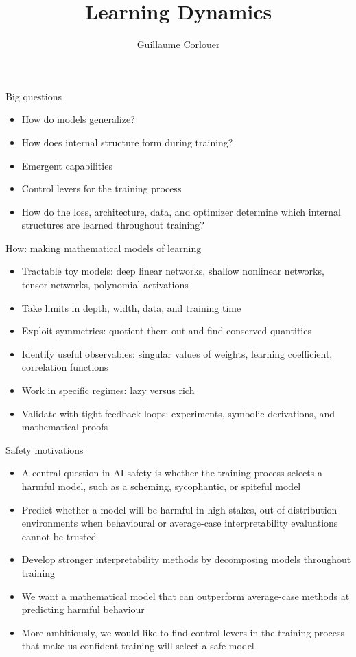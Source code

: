 \documentclass[aspectratio=169,11pt]{beamer}
\title[]{Learning Dynamics}
\author[Corlouer]{Guillaume Corlouer}
\institute{Stormglass}
\date{}
\begin{document}
\maketitle
\begin{frame}{Big questions}
\begin{itemize}
    \item How do models generalize?
    \item How does internal structure form during training?
    \item Emergent capabilities
    \item Control levers for the training process
    \item How do the loss, architecture, data, and optimizer determine which internal structures are learned throughout training?
\end{itemize}
\end{frame}
\begin{frame}{How: making mathematical models of learning}
    \begin{itemize}
        \item Tractable toy models: deep linear networks, shallow nonlinear networks, tensor networks, polynomial activations
        \item Take limits in depth, width, data, and training time
        \item Exploit symmetries: quotient them out and find conserved quantities
        \item Identify useful observables: singular values of weights, learning coefficient, correlation functions
        \item Work in specific regimes: lazy versus rich
        \item Validate with tight feedback loops: experiments, symbolic derivations, and mathematical proofs
    \end{itemize}
\end{frame}
\begin{frame}{Safety motivations}
    \begin{itemize}
        \item A central question in AI safety is whether the training process selects a harmful model, such as a scheming, sycophantic, or spiteful model
        \item Predict whether a model will be harmful in high-stakes, out-of-distribution environments when behavioural or average-case interpretability evaluations cannot be trusted
        \item Develop stronger interpretability methods by decomposing models throughout training
        \item We want a mathematical model that can outperform average-case methods at predicting harmful behaviour
        \item More ambitiously, we would like to find control levers in the training process that make us confident training will select a safe model
    \end{itemize}
\end{frame}
\end{document}
